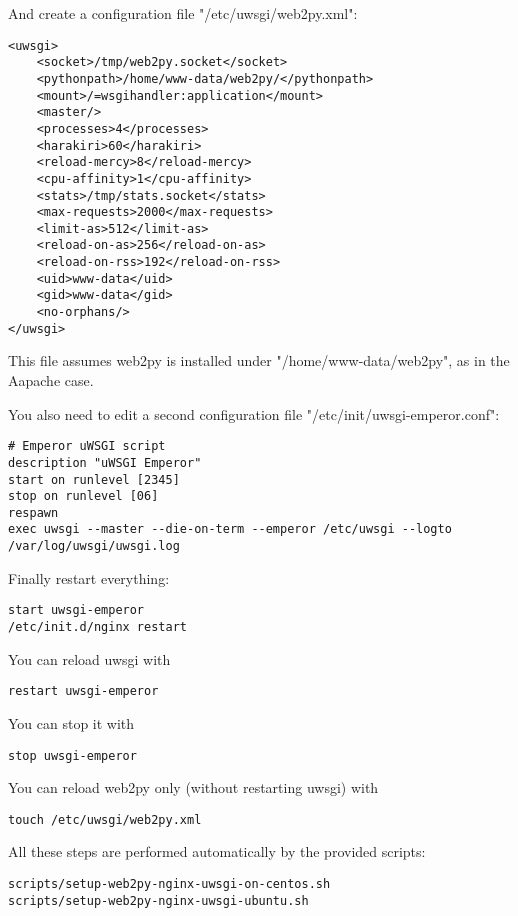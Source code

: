\documentclass[justified,sixbynine,notoc]{tufte-book}
\begin{document}
\begin{fullwidth}
And create a configuration file "/etc/uwsgi/web2py.xml":

\begin{lstlisting}[keywords={}]
<uwsgi>
    <socket>/tmp/web2py.socket</socket>
    <pythonpath>/home/www-data/web2py/</pythonpath>
    <mount>/=wsgihandler:application</mount>
    <master/>
    <processes>4</processes>
    <harakiri>60</harakiri>
    <reload-mercy>8</reload-mercy>
    <cpu-affinity>1</cpu-affinity>
    <stats>/tmp/stats.socket</stats>
    <max-requests>2000</max-requests>
    <limit-as>512</limit-as>
    <reload-on-as>256</reload-on-as>
    <reload-on-rss>192</reload-on-rss>
    <uid>www-data</uid>
    <gid>www-data</gid>
    <no-orphans/>
</uwsgi>
\end{lstlisting}

This file assumes web2py is installed under "/home/www-data/web2py", as in the Aapache case.

You also need to edit a second configuration file "/etc/init/uwsgi-emperor.conf":

\begin{lstlisting}
# Emperor uWSGI script 
description "uWSGI Emperor"
start on runlevel [2345]
stop on runlevel [06]
respawn
exec uwsgi --master --die-on-term --emperor /etc/uwsgi --logto /var/log/uwsgi/uwsgi.log
\end{lstlisting}

Finally restart everything:

\begin{lstlisting}
start uwsgi-emperor
/etc/init.d/nginx restart 
\end{lstlisting}

You can reload uwsgi with
\begin{lstlisting}
restart uwsgi-emperor
\end{lstlisting}
You can stop it with
\begin{lstlisting}
stop uwsgi-emperor
\end{lstlisting}
You can reload web2py only (without restarting uwsgi) with
\begin{lstlisting}
touch /etc/uwsgi/web2py.xml
\end{lstlisting}

All these steps are performed automatically by the provided scripts:

\begin{lstlisting}
scripts/setup-web2py-nginx-uwsgi-on-centos.sh
scripts/setup-web2py-nginx-uwsgi-ubuntu.sh
\end{lstlisting}


\end{fullwidth}
\end{document}
